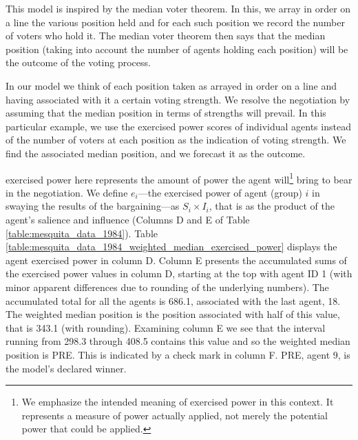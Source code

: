 This model is inspired by the median voter theorem. In this, we array in order on a line the various   {position} held and for each such   {position} we record the number of voters who hold it. The median voter theorem then says that the median   {position} (taking into account the number of agents holding each   {position}) will be the outcome of the voting process. 

In our model we  think of each   {position} taken as arrayed in order on a line and  having associated with it a certain voting strength.  We resolve the negotiation by assuming that the median   {position} in terms of strengths will prevail.    In this particular example, we use the   {exercised power} scores of individual agents instead of the number of voters at each   {position} as the indication of voting strength. We find the associated median   {position}, and we forecast it as the outcome.




   {exercised power} here represents the amount of power the agent will\footnote{We emphasize the intended meaning of   {exercised power} in this context. It represents a measure of power actually applied, not merely the potential  power that could be applied.}  bring to bear in the negotiation.
We define $e_i$---the   {exercised power} of agent (group) $i$ in swaying the results of the bargaining---as $S_i\times I_i$, that is as the product of the agent's   {salience} and   {influence} (Columns D and E  of 
Table \ref{table:mesquita_data_1984}).  Table \ref{table:mesquita_data_1984_weighted_median_exercised_power} displays the agent   {exercised power} in column D. Column E presents the accumulated sums of the   {exercised power} values in column D, starting at the top with agent ID 1 (with minor apparent differences due to rounding of the underlying numbers). The accumulated total for all the agents is 686.1, associated with the last agent, 18. The weighted median position is the position associated with half of this value, that is 343.1 (with rounding). Examining column E we see that the %
 interval running from 298.3 through 408.5 contains this value and so the weighted median position is PRE. This is indicated by a check mark in column F. %
PRE, agent 9, is the model's declared winner.

